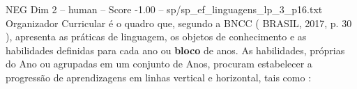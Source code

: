 \begin{textsample}{NEG Dim 2 – human – Score -1.00 – sp/sp\_ef\_linguagens\_lp\_3\_p16.txt}  \label{ex:f2_neg_014}
Organizador Curricular é o quadro que, segundo a BNCC ( BRASIL, 2017, p. 30 ), apresenta as práticas de linguagem, os objetos de conhecimento e as habilidades definidas para cada ano ou \textbf{bloco} de anos.
As habilidades, próprias do Ano ou agrupadas em um conjunto de Anos, procuram estabelecer a progressão de aprendizagens em linhas vertical e horizontal, tais como :

\end{textsample}
